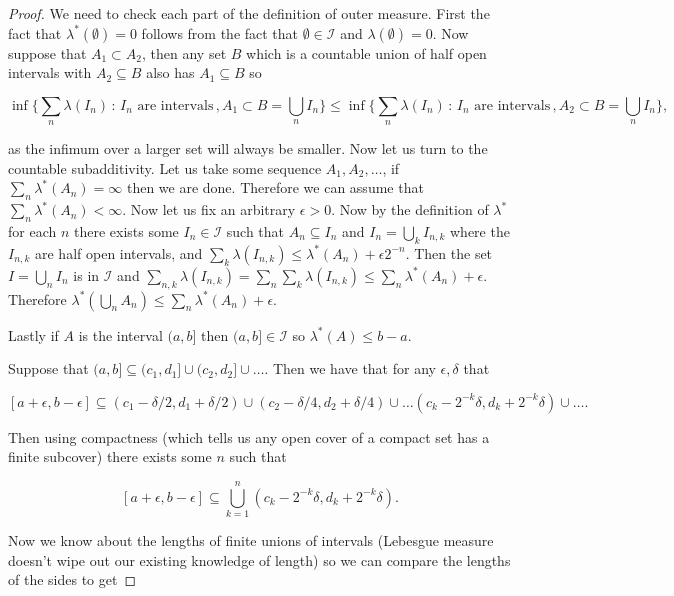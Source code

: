 \documentclass[
]{book}
\theoremstyle{definition}
\theoremstyle{definition}
\theoremstyle{definition}
\theoremstyle{definition}
\theoremstyle{remark}
\begin{document}
\begin{proof}
We need to check each part of the definition of outer measure. First the fact that \(\lambda^*(\emptyset) = 0\) follows from the fact that \(\emptyset \in \mathcal{I}\) and \(\lambda(\emptyset) = 0\). Now suppose that \(A_1 \subset A_2\), then any set \(B\) which is a countable union of half open intervals with \(A_2 \subseteq B\) also has \(A_1 \subseteq B\) so

\[ \inf \{ \sum_n\lambda (I_n) \, : \, \mbox{$I_n$ are intervals}\,, A_1 \subset B = \bigcup_n I_n\} \leq \inf \{ \sum_n\lambda (I_n) \, : \, \mbox{$I_n$ are intervals}\,, A_2 \subset B = \bigcup_n I_n\}, \]

as the infimum over a larger set will always be smaller. Now let us turn to the countable subadditivity. Let us take some sequence \(A_1, A_2, \dots\), if \(\sum_n \lambda^*(A_n) = \infty\) then we are done. Therefore we can assume that \(\sum_n \lambda^*(A_n) < \infty\). Now let us fix an arbitrary \(\epsilon>0\). Now by the definition of \(\lambda^*\) for each \(n\) there exists some \(I_n \in \mathcal{I}\) such that \(A_n \subseteq I_n\) and \(I_n = \bigcup_k I_{n,k}\) where the \(I_{n,k}\) are half open intervals, and \(\sum_k\lambda(I_{n,k}) \leq \lambda^* (A_n) + \epsilon 2^{-n}\). Then the set \(I = \bigcup_n I_n\) is in \(\mathcal{I}\) and \(\sum_{n,k}\lambda(I_{n,k}) = \sum_n \sum_k\lambda(I_{n,k}) \leq \sum_n \lambda^*(A_n) + \epsilon\). Therefore \(\lambda^*(\bigcup_n A_n) \leq \sum_n \lambda^*(A_n) + \epsilon\).

Lastly if \(A\) is the interval \((a,b]\) then \((a,b] \in \mathcal{I}\) so \(\lambda^*(A) \leq b-a\).

Suppose that \((a,b] \subseteq (c_1,d_1] \cup (c_2, d_2] \cup \dots\). Then we have that for any \(\epsilon, \delta\) that

\[ [a+\epsilon, b-\epsilon] \subseteq (c_1-\delta/2, d_1 + \delta/2) \cup (c_2 - \delta/4, d_2 + \delta/4) \cup \dots (c_k -2^{-k} \delta, d_k + 2^{-k} \delta) \cup \dots.  \]

Then using compactness (which tells us any open cover of a compact set has a finite subcover) there exists some \(n\) such that

\[ [a+\epsilon, b-\epsilon] \subseteq \bigcup_{k=1}^n (c_k -2^{-k}\delta, d_k + 2^{-k} \delta). \]

Now we know about the lengths of finite unions of intervals (Lebesgue measure doesn't wipe out our existing knowledge of length) so we can compare the lengths of the sides to get


\end{proof}
\end{document}
